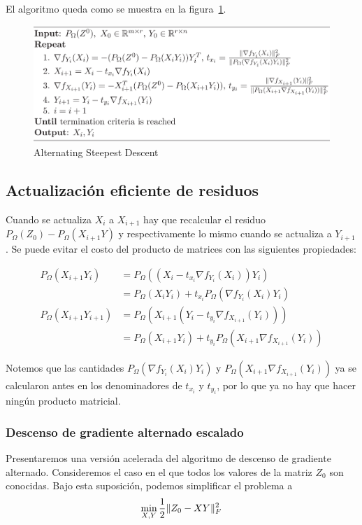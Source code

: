 El algoritmo queda como se muestra en la figura~\ref{fig:ASD}.
\begin{figure}[htpb]
    \centering
    \includegraphics[width=0.95\linewidth]{../Results/ASD_Images/ASD.PNG}
    \caption{Alternating Steepest Descent}\label{fig:ASD}
\end{figure}

\subsection{Actualización eficiente de residuos}
Cuando se actualiza $X_i$ a $X_{i+1}$ hay que recalcular el residuo $P_{\Omega}(Z_0) - P_{\Omega}(X_{i+1}Y)$ y respectivamente lo mismo cuando se actualiza a $Y_{i+1}$. Se puede evitar el costo del producto de matrices con las siguientes propiedades:

\begin{align*}
    P_{\Omega}(X_{i+1}Y_i) &= P_{\Omega}\left( \left( X_i - t_{x_i} \nabla f_{Y_i}(X_i) \right) Y_i \right) \\
                                           &       = P_{\Omega}(X_i Y_i) + t_{x_i} P_{\Omega}\left( \nabla f_{Y_i} (X_i) Y_i \right) \\
    P_{\Omega}(X_{i+1}Y_{i+1}) &= P_{\Omega}\left( X_{i+1} (Y_i - t_{y_i} \nabla f_{X_{i+1}} (Y_i)) \right) \\
                                                 & = P_{\Omega}(X_{i+1}Y_i) + t_{y_i} P_{\Omega}\left( X_{i+1} \nabla f_{X_{i+1}} (Y_i) \right)
\end{align*}

Notemos que las cantidades $P_{\Omega}\left( \nabla f_{Y_i} (X_i) Y_i\right)$ y $P_{\Omega}\left( X_{i+1} \nabla f_{X_{i+1}} (Y_i)\right)$ ya se calcularon antes en los denominadores de $t_{x_i}$ y $t_{y_i}$, por lo que ya no hay que hacer ningún producto matricial.

\subsubsection{Descenso de gradiente alternado escalado}
\label{ssub:escalado}
Presentaremos una versión acelerada del algoritmo de descenso de gradiente alternado. Consideremos el caso en el que todos los valores de la matriz $Z_0$ son conocidas. Bajo esta suposición, podemos simplificar el problema a
\begin{equation*}
    \min_{X, Y} \frac{1}{2} \lVert Z_0 - XY\rVert_F^2
\end{equation*}

